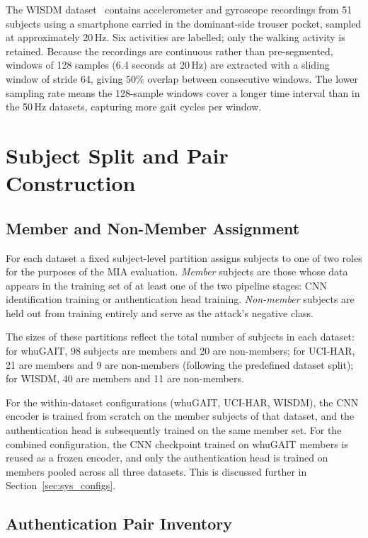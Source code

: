 The WISDM dataset~\cite{weiss2019smartphone} contains accelerometer and gyroscope recordings from 51 subjects using a smartphone carried in the dominant-side trouser pocket, sampled at approximately 20\,Hz. Six activities are labelled; only the walking activity is retained. Because the recordings are continuous rather than pre-segmented, windows of 128 samples (6.4 seconds at 20\,Hz) are extracted with a sliding window of stride 64, giving 50\% overlap between consecutive windows. The lower sampling rate means the 128-sample windows cover a longer time interval than in the 50\,Hz datasets, capturing more gait cycles per window.

\section{Subject Split and Pair Construction}
\label{sec:sys_split}

\subsection{Member and Non-Member Assignment}
\label{ssec:sys_membership}

For each dataset a fixed subject-level partition assigns subjects to one of two roles for the purposes of the MIA evaluation. \emph{Member} subjects are those whose data appears in the training set of at least one of the two pipeline stages: CNN identification training or authentication head training. \emph{Non-member} subjects are held out from training entirely and serve as the attack's negative class.

The sizes of these partitions reflect the total number of subjects in each dataset: for whuGAIT, 98 subjects are members and 20 are non-members; for UCI-HAR, 21 are members and 9 are non-members (following the predefined dataset split); for WISDM, 40 are members and 11 are non-members.

For the within-dataset configurations (whuGAIT, UCI-HAR, WISDM), the CNN encoder is trained from scratch on the member subjects of that dataset, and the authentication head is subsequently trained on the same member set. For the combined configuration, the CNN checkpoint trained on whuGAIT members is reused as a frozen encoder, and only the authentication head is trained on members pooled across all three datasets. This is discussed further in Section~\ref{sec:sys_configs}.

\subsection{Authentication Pair Inventory}
\label{ssec:sys_pairs}

